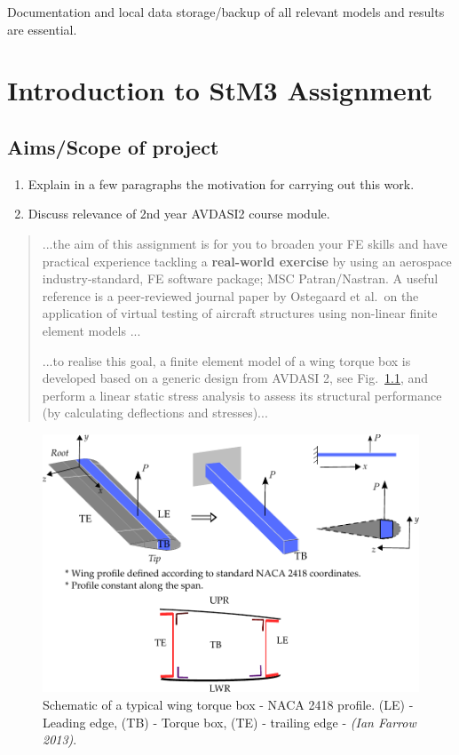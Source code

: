 \documentclass[11pt,a4paper,oneside]{memoir}
\begin{document}
Documentation and local data storage/backup of all relevant models and results are essential.  

\chapter{Introduction to StM3 Assignment}\label{chap:intro}
\section{Aims/Scope of project}
\begin{enumerate}
	\item Explain in a few paragraphs the motivation for carrying out this work. 
	\item Discuss relevance of 2nd year AVDASI2 course module.
\end{enumerate}
%
\begin{quote}
...the aim of this assignment is for you to broaden your FE skills and have practical experience tackling a \textbf{real-world exercise} by using an aerospace industry-standard, FE software package; MSC Patran/Nastran. A useful reference is a peer-reviewed journal paper by Ostegaard et al.~on the application of virtual testing of aircraft structures using non-linear finite element models \cite{ostergaard2011virtual}...

...to realise this goal, a finite element model of a wing torque box is developed based on a generic design from AVDASI 2, see Fig.~\ref{fig:ASD2-DBT-Wing-5-revised}, and perform a linear static stress analysis to assess its structural performance (by calculating deflections and stresses)...
\end{quote}

\begin{figure}
  \includegraphics[width=\textwidth]{ASD2-DBT-Wing-5-revised-2018.pdf}
  \caption{Schematic of a typical wing torque box - NACA 2418 profile. (LE) - Leading edge, (TB) - Torque box, (TE) - trailing edge  - \textit{(Ian Farrow 2013)}.}
  \label{fig:ASD2-DBT-Wing-5-revised}
\end{figure}
\end{document}
